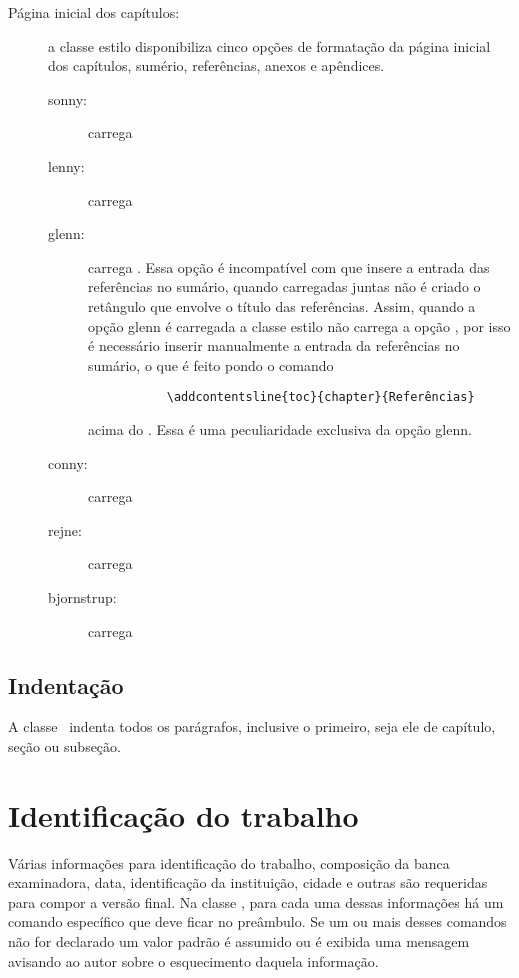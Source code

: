 \begin{description}
\item[Página inicial dos capítulos:] a classe estilo disponibiliza cinco opções
    de formatação da página inicial dos capítulos, sumério, referências, anexos e apêndices.
    \begin{description}
    	\item[sonny:] carrega 
    	\item[lenny:] carrega 
    	\item[glenn:] carrega . Essa opção é incompatível com  que insere a entrada das referências no sumário, quando carregadas juntas não é criado o retângulo que envolve o título das referências. Assim, quando a opção glenn é carregada a classe estilo não carrega a opção , por isso é necessário inserir manualmente a entrada da referências no sumário, o que é feito pondo o comando
    	\begin{tcolorbox}
    	\begin{lstlisting}
    	   \addcontentsline{toc}{chapter}{Referências}
    	\end{lstlisting}
    	\end{tcolorbox}
    	acima do . Essa é uma peculiaridade exclusiva da opção glenn.
    	\item[conny:] carrega 
    	\item[rejne:] carrega 
    	\item[bjornstrup:] carrega 
    \end{description}
\end{description}

\section{Indentação}

A classe \estilo\ indenta todos os parágrafos,
inclusive o primeiro, seja ele de capítulo, seção ou subseção.

\chapter{Identificação do trabalho}\label{identifica}

Várias informações para identificação do trabalho, composição da
banca examinadora, data, identificação da instituição, cidade e
outras são requeridas para compor a versão final. Na classe \estilo,
para cada uma dessas informações há um comando específico que deve
ficar no preâmbulo. Se um ou mais desses comandos não for declarado
um valor padrão é assumido ou é exibida uma mensagem avisando ao
autor sobre o esquecimento daquela informação.

